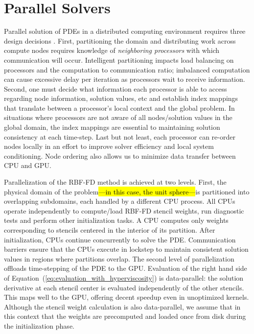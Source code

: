 
\chapter{Parallel Solvers}
\label{sec:rbffd_gpu}

Parallel solution of PDEs in a distributed computing environment requires three
design decisions \cite{Saad2003}. First, partitioning the domain and
distributing work across compute nodes requires knowledge of \emph{neighboring processors} with which communication will occur. Intelligent partitioning
impacts load balancing on processors and the computation to communication
ratio; imbalanced computation can cause excessive delay per
iteration as processors wait to receive information. Second, one must decide
what information each processor is able to access regarding node information,
solution values, etc and establish index mappings that translate between a
processor's local context and the global problem. In situations where
processors are not aware of all nodes/solution values in the global domain, the
index mappings are essential to maintaining solution consistency at each
time-step. Last but not least, each processor can re-order nodes locally in an
effort to improve solver efficiency and local system conditioning. Node
ordering also allows us to minimize data transfer between CPU and GPU. 


Parallelization of the RBF-FD method is achieved at two levels. First, the
physical domain of the problem\hl{---in this case, the unit sphere---}is partitioned
into overlapping subdomains, each handled by a different CPU process. All CPUs
operate independently to compute/load RBF-FD stencil weights, run diagnostic
tests and perform other initialization tasks. A CPU computes only weights
corresponding to stencils centered in the interior of its partition. After
initialization, CPUs continue concurrently to solve the PDE. Communication
barriers ensure that the CPUs execute in lockstep to maintain consistent
solution values in regions where partitions overlap.  The second level of
parallelization offloads time-stepping of the PDE to the GPU.  Evaluation of
the right hand side of Equation~(\ref{eq:evaluation_with_hyperviscosity}) is
data-parallel: the solution derivative at each stencil center is evaluated
independently of the other stencils. This maps well to the GPU, offering decent
speedup even in unoptimized kernels. Although the stencil weight calculation is
also data-parallel, we assume that in this context that the weights are
precomputed and loaded once from disk during the initialization phase. 

